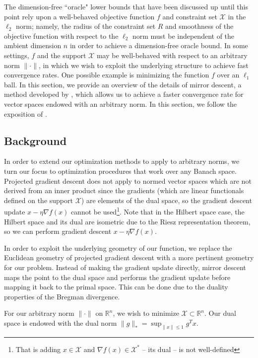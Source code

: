 

The dimension-free ``oracle" lower bounds that have been discussed up until this point rely upon a well-behaved objective function $f$ and constraint set $\mathcal{X}$ in the $\ell_2$ norm; namely, the radius of the constraint set $R$ and smoothness of the objective function with respect to the $\ell_2$ norm must be independent of the ambient dimension $n$ in order to achieve a dimension-free oracle bound. In some settings, $f$ and the support $\mathcal{X}$ may be well-behaved with respect to an arbitrary norm $\|\cdot \|$, in which we wish to exploit the underlying structure to achieve fast convergence rates. One possible example is minimizing the function $f$ over an $\ell_1$ ball. In this section, we provide an overview of the details of mirror descent, a method developed by \citet{blair1985problem}, which allows us to achieve a faster convergence rate for vector spaces endowed with an arbitrary norm. In this section, we follow the exposition of \citet{DBLP:journals/ftml/Bubeck15}.

\subsection{Background}
In order to extend our optimization methods to apply to arbitrary norms, we turn our focus to optimization procedures that work over any Banach space. Projected gradient descent does not apply to normed vector spaces which are not derived from an inner product since the gradients (which are linear functionals defined on the support $\mathcal{X}$) are elements of the dual space, so the gradient descent update $x - \eta \nabla f(x)$ cannot be used\footnote{That is adding $x \in \mathcal{X}$ and $\nabla f(x) \in \mathcal{X}^{*}$ -- its dual -- is not well-defined}. Note that in the Hilbert space case, the Hilbert space and its dual are isometric due to the Riesz representation theorem, so we can perform gradient descent $x - \eta \nabla f(x)$.

In order to exploit the underlying geometry of our function, we replace the Euclidean geometry of projected gradient descent with a more pertinent geometry for our problem. Instead of making the gradient update directly, mirror descent maps the point to the dual space and performs the gradient update before mapping it back to the primal space. This can be done due to the duality properties of the Bregman divergence.

For our arbitrary norm $\|\cdot \|$ on $\mathbb{R}^n$, we wish to minimize $\mathcal{X} \subset \mathbb{R}^n$. Our dual space is endowed with the dual norm $\|g \|_* = \sup_{\|x\|\leq 1} g^Tx$.


